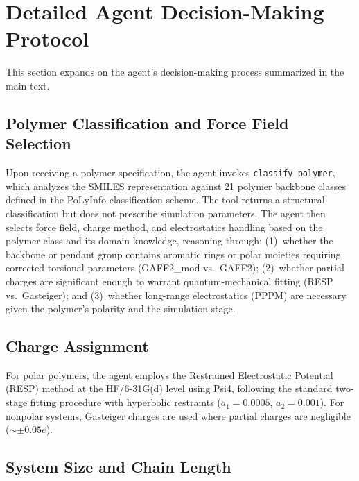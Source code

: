 \documentclass[journal=acsami,manuscript=suppinfo]{achemso}
\begin{document}
\section{Detailed Agent Decision-Making Protocol}
\label{sec:si_decision_protocol}

This section expands on the agent's decision-making process summarized in the main text.

\subsection{Polymer Classification and Force Field Selection}

Upon receiving a polymer specification, the agent invokes \texttt{classify\_polymer}, which analyzes the SMILES representation against 21 polymer backbone classes defined in the PoLyInfo classification scheme.\cite{otsuka2011polyinfo}
The tool returns a structural classification but does not prescribe simulation parameters.
The agent then selects force field, charge method, and electrostatics handling based on the polymer class and its domain knowledge, reasoning through: (1)~whether the backbone or pendant group contains aromatic rings or polar moieties requiring corrected torsional parameters (GAFF2\_mod\cite{trag2019gaff2mod} vs.\ GAFF2\cite{wang2004gaff}); (2)~whether partial charges are significant enough to warrant quantum-mechanical fitting (RESP vs.\ Gasteiger); and (3)~whether long-range electrostatics (PPPM) are necessary given the polymer's polarity and the simulation stage.

\subsection{Charge Assignment}

For polar polymers, the agent employs the Restrained Electrostatic Potential (RESP) method\cite{bayly1993resp} at the HF/6-31G(d) level using Psi4,\cite{smith2020psi4} following the standard two-stage fitting procedure with hyperbolic restraints ($a_1 = 0.0005$, $a_2 = 0.001$).
For nonpolar systems, Gasteiger charges are used where partial charges are negligible ($\sim\pm 0.05e$).

\subsection{System Size and Chain Length}
\end{document}
